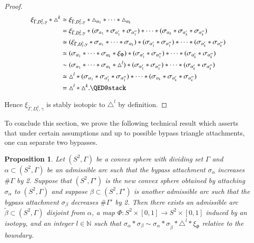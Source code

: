 \documentclass[12pt]{amsart}
\newtheorem{prop}[thm]{Proposition}
\theoremstyle{remark}
\begin{document}
\begin{proof}
\begin{align*}
\xi_{\tilde\Gamma,D^2_\epsilon,\gamma}\ast\triangle^k
&\simeq\xi_{\tilde\Gamma,D^2_\epsilon,\gamma}\ast\triangle_{\alpha_1}\ast\cdots\ast\triangle_{\alpha_k} \\ &=\xi_{\tilde\Gamma,D^2_\epsilon,\gamma}\ast(\sigma_{\alpha_1}\ast\sigma_{\alpha'_1}\ast\sigma_{\alpha''_1})\ast\cdots\ast(\sigma_{\alpha_k}\ast\sigma_{\alpha'_k}\ast\sigma_{\alpha''_k}) \\
&\simeq(\xi_{\tilde\Gamma,D^2_\epsilon,\gamma}\ast\sigma_{\alpha_1}\ast\cdots\ast\sigma_{\alpha_k})\ast(\sigma_{\alpha'_1}\ast\sigma_{\alpha''_1})\ast\cdots\ast(\sigma_{\alpha'_k}\ast\sigma_{\alpha''_k}) \\
&\simeq(\sigma_{\alpha_1}\ast\cdots\ast\sigma_{\alpha_k}\ast\xi_{\Phi})\ast(\sigma_{\alpha'_1}\ast\sigma_{\alpha''_1})\ast\cdots\ast(\sigma_{\alpha'_k}\ast\sigma_{\alpha''_k}) \\
&\sim(\sigma_{\alpha_1}\ast\cdots\ast\sigma_{\alpha_k}\ast\triangle^l)\ast(\sigma_{\alpha'_1}\ast\sigma_{\alpha''_1})\ast\cdots\ast(\sigma_{\alpha'_k}\ast\sigma_{\alpha''_k}) \\
&\simeq\triangle^l\ast(\sigma_{\alpha_1}\ast\sigma_{\alpha'_1}\ast\sigma_{\alpha''_1})\ast\cdots\ast(\sigma_{\alpha_k}\ast\sigma_{\alpha'_k}\ast\sigma_{\alpha''_k}) \\
&=\triangle^l\ast\triangle^k.
\qedhere
\end{align*}

Hence $\xi_{\tilde\Gamma,D^2_\epsilon,\gamma}$ is stably isotopic to $\triangle^l$ by definition.

\end{proof}

To conclude this section, we prove the following technical result which asserts that under certain assumptions and up to possible bypass triangle attachments, one can separate two bypasses.

\begin{prop} \label{disjointness}
Let $(S^2,\Gamma)$ be a convex sphere with dividing set $\Gamma$ and $\alpha\subset(S^2,\Gamma)$ be an admissible arc such that the bypass attachment $\sigma_\alpha$ increases $\#\Gamma$ by 2. Suppose that $(S^2,\Gamma')$ is the new convex sphere obtained by attaching $\sigma_\alpha$ to $(S^2,\Gamma)$ and suppose $\beta\subset(S^2,\Gamma')$ is another admissible arc such that the bypass attachment $\sigma_\beta$ decreases $\#\Gamma'$ by 2. Then there exists an admissible arc $\tilde\beta\subset(S^2,\Gamma)$ disjoint from $\alpha$, a map $\Phi:S^2\times[0,1] \to S^2\times[0,1]$ induced by an isotopy, and an integer $l\in\mathbb{N}$ such that $\sigma_\alpha\ast\sigma_\beta \sim \sigma_\alpha\ast\sigma_{\tilde\beta}\ast\triangle^l\ast\xi_\Phi$ relative to the boundary.
\end{prop}
\end{document}
